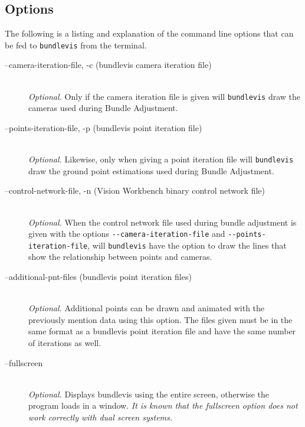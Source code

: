 \subsection{Options}

The following is a listing and explanation of the command line options
that can be fed to \texttt{bundlevis} from the terminal.

\begin{description}

\item[--camera-iteration-file, -c \textnormal{\small{(bundlevis camera iteration file)}}] \hfill \\

  \emph{Optional.} Only if the camera iteration file is given will
  \texttt{bundlevis} draw the cameras used during Bundle Adjustment.

\item[--points-iteration-file, -p \textnormal{\small{(bundlevis point iteration file)}}] \hfill \\

  \emph{Optional.} Likewise, only when giving a point iteration file
  will \texttt{bundlevis} draw the ground point estimations used
  during Bundle Adjustment.

\item[--control-network-file, -n \textnormal{\small{(Vision Workbench binary control network file)}}] \hfill \\

  \emph{Optional.} When the control network file used during bundle
  adjustment is given with the options \verb=--camera-iteration-file=
  and \verb=--points-iteration-file=, will \texttt{bundlevis} have the
  option to draw the lines that show the relationship between points
  and cameras.

\item[--additional-pnt-files \textnormal{\small{(bundlevis point iteration files)}}] \hfill \\

  \emph{Optional.} Additional points can be drawn and animated with
  the previously mention data using this option. The files given must
  be in the same format as a bundlevis point iteration file and have
  the same number of iterations as well.

\item[--fullscreen] \hfill \\

  \emph{Optional.} Displays bundlevis using the entire screen,
  otherwise the program loads in a window. \emph{It is known that the
    fullscreen option does not work correctly with dual screen
    systems.}


\end{description}
